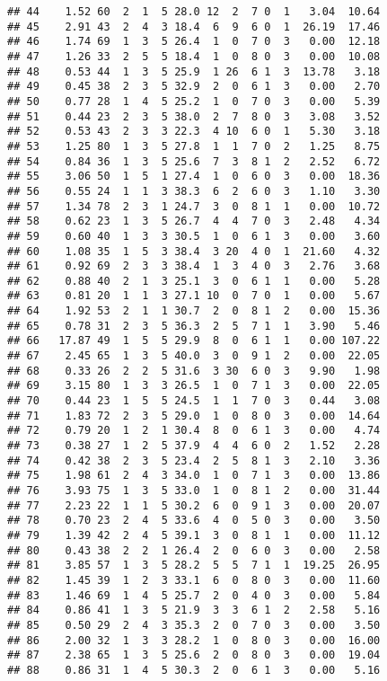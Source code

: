 \documentclass[
]{article}
\begin{document}
\begin{verbatim}
## 44    1.52 60  2  1  5 28.0 12  2  7 0  1   3.04  10.64
## 45    2.91 43  2  4  3 18.4  6  9  6 0  1  26.19  17.46
## 46    1.74 69  1  3  5 26.4  1  0  7 0  3   0.00  12.18
## 47    1.26 33  2  5  5 18.4  1  0  8 0  3   0.00  10.08
## 48    0.53 44  1  3  5 25.9  1 26  6 1  3  13.78   3.18
## 49    0.45 38  2  3  5 32.9  2  0  6 1  3   0.00   2.70
## 50    0.77 28  1  4  5 25.2  1  0  7 0  3   0.00   5.39
## 51    0.44 23  2  3  5 38.0  2  7  8 0  3   3.08   3.52
## 52    0.53 43  2  3  3 22.3  4 10  6 0  1   5.30   3.18
## 53    1.25 80  1  3  5 27.8  1  1  7 0  2   1.25   8.75
## 54    0.84 36  1  3  5 25.6  7  3  8 1  2   2.52   6.72
## 55    3.06 50  1  5  1 27.4  1  0  6 0  3   0.00  18.36
## 56    0.55 24  1  1  3 38.3  6  2  6 0  3   1.10   3.30
## 57    1.34 78  2  3  1 24.7  3  0  8 1  1   0.00  10.72
## 58    0.62 23  1  3  5 26.7  4  4  7 0  3   2.48   4.34
## 59    0.60 40  1  3  3 30.5  1  0  6 1  3   0.00   3.60
## 60    1.08 35  1  5  3 38.4  3 20  4 0  1  21.60   4.32
## 61    0.92 69  2  3  3 38.4  1  3  4 0  3   2.76   3.68
## 62    0.88 40  2  1  3 25.1  3  0  6 1  1   0.00   5.28
## 63    0.81 20  1  1  3 27.1 10  0  7 0  1   0.00   5.67
## 64    1.92 53  2  1  1 30.7  2  0  8 1  2   0.00  15.36
## 65    0.78 31  2  3  5 36.3  2  5  7 1  1   3.90   5.46
## 66   17.87 49  1  5  5 29.9  8  0  6 1  1   0.00 107.22
## 67    2.45 65  1  3  5 40.0  3  0  9 1  2   0.00  22.05
## 68    0.33 26  2  2  5 31.6  3 30  6 0  3   9.90   1.98
## 69    3.15 80  1  3  3 26.5  1  0  7 1  3   0.00  22.05
## 70    0.44 23  1  5  5 24.5  1  1  7 0  3   0.44   3.08
## 71    1.83 72  2  3  5 29.0  1  0  8 0  3   0.00  14.64
## 72    0.79 20  1  2  1 30.4  8  0  6 1  3   0.00   4.74
## 73    0.38 27  1  2  5 37.9  4  4  6 0  2   1.52   2.28
## 74    0.42 38  2  3  5 23.4  2  5  8 1  3   2.10   3.36
## 75    1.98 61  2  4  3 34.0  1  0  7 1  3   0.00  13.86
## 76    3.93 75  1  3  5 33.0  1  0  8 1  2   0.00  31.44
## 77    2.23 22  1  1  5 30.2  6  0  9 1  3   0.00  20.07
## 78    0.70 23  2  4  5 33.6  4  0  5 0  3   0.00   3.50
## 79    1.39 42  2  4  5 39.1  3  0  8 1  1   0.00  11.12
## 80    0.43 38  2  2  1 26.4  2  0  6 0  3   0.00   2.58
## 81    3.85 57  1  3  5 28.2  5  5  7 1  1  19.25  26.95
## 82    1.45 39  1  2  3 33.1  6  0  8 0  3   0.00  11.60
## 83    1.46 69  1  4  5 25.7  2  0  4 0  3   0.00   5.84
## 84    0.86 41  1  3  5 21.9  3  3  6 1  2   2.58   5.16
## 85    0.50 29  2  4  3 35.3  2  0  7 0  3   0.00   3.50
## 86    2.00 32  1  3  3 28.2  1  0  8 0  3   0.00  16.00
## 87    2.38 65  1  3  5 25.6  2  0  8 0  3   0.00  19.04
## 88    0.86 31  1  4  5 30.3  2  0  6 1  3   0.00   5.16

\end{verbatim}
\end{document}

